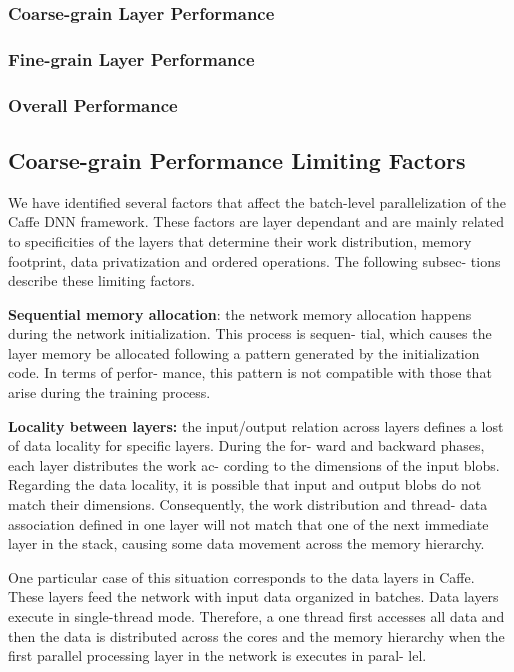 \subsubsection{Coarse-grain Layer Performance}

\subsubsection{Fine-grain Layer Performance}

\subsubsection{Overall Performance}

\subsection{Coarse-grain Performance Limiting Factors}
We have identified several factors that affect the batch-level
parallelization of the Caffe DNN framework. These factors are
layer dependant and are mainly related to specificities of the
layers that determine their work distribution, memory footprint,
data privatization and ordered operations. The following subsec-
tions describe these limiting factors.

\textbf{Sequential memory allocation}: the network memory allocation
happens during the network initialization. This process is sequen-
tial, which causes the layer memory be allocated following a
pattern generated by the initialization code. In terms of perfor-
mance, this pattern is not compatible with those that arise during
the training process.

\textbf{Locality between layers:} the input/output relation across layers
defines a lost of data locality for specific layers. During the for-
ward and backward phases, each layer distributes the work ac-
cording to the dimensions of the input blobs. Regarding the data
locality, it is possible that input and output blobs do not match
their dimensions. Consequently, the work distribution and thread-
data association defined in one layer will not match that one of the
next immediate layer in the stack, causing some data movement
across the memory hierarchy.

One particular case of this situation corresponds to the data
layers in Caffe. These layers feed the network with input data
organized in batches. Data layers execute in single-thread mode.
Therefore, a one thread first accesses all data and then the data is
distributed across the cores and the memory hierarchy when the
first parallel processing layer in the network is executes in paral-
lel. 

